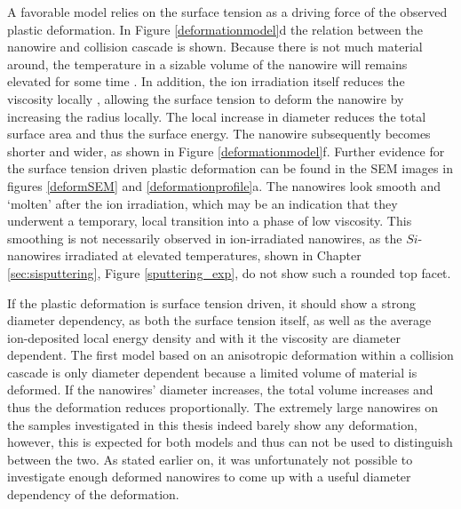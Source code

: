 \begin{Figure}[h]
A favorable model relies on the surface tension as a driving force of the observed plastic deformation. In Figure \ref{deformationmodel}d the relation between the nanowire and collision cascade is shown. Because there is not much material around, the temperature in a sizable volume of the nanowire will remains elevated for some time \cite{borschel_ion-solid_2012,greaves_enhanced_2013,anders_sputtering_2015,johannes_ion_2015}. In addition, the ion irradiation itself reduces the viscosity locally \cite{snoeks_stress_1997,hu_burrowing_2002,mayr_mechanisms_2003}, allowing the surface tension to deform the nanowire by increasing the radius locally. The local increase in diameter reduces the total surface area and thus the surface energy. The nanowire subsequently becomes shorter and wider, as shown in Figure \ref{deformationmodel}f. Further evidence for the surface tension driven plastic deformation can be found in the SEM images in figures \ref{deformSEM} and \ref{deformationprofile}a. The nanowires look smooth and `molten' after the ion irradiation, which may be an indication that they underwent a temporary, local transition into a phase of low viscosity. This smoothing is not necessarily observed in ion-irradiated nanowires, as the $Si$-nanowires irradiated at elevated temperatures, shown in Chapter \ref{sec:sisputtering}, Figure \ref{sputtering_exp}, do not show such a rounded top facet.

If the plastic deformation is surface tension driven, it should show a strong diameter dependency, as both the surface tension itself, as well as the average ion-deposited local energy density and with it the viscosity are diameter dependent. The first model based on an anisotropic deformation within a collision cascade is only diameter dependent because a limited volume of material is  deformed. If the nanowires' diameter increases, the total volume increases and thus the deformation reduces proportionally. The extremely large nanowires on the samples investigated in this thesis indeed barely show any deformation, however, this is expected for both models and thus can not be used to distinguish between the two. As stated earlier on, it was unfortunately not possible to investigate enough deformed nanowires to come up with a useful diameter dependency of the deformation.


\end{Figure}
